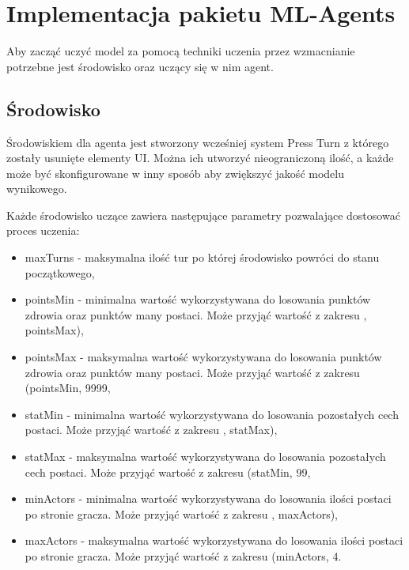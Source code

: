 \documentclass{SGGW-thesis}
\begin{document}
\section{Implementacja pakietu ML-Agents}
Aby zacząć uczyć model za pomocą techniki uczenia przez wzmacnianie potrzebne jest środowisko oraz uczący się w nim agent.
\subsection{Środowisko}
Środowiskiem dla agenta jest stworzony wcześniej system Press Turn z którego zostały usunięte elementy UI. Można ich utworzyć nieograniczoną ilość, a każde może być skonfigurowane w inny sposób aby zwiększyć jakość modelu wynikowego.

\pagebreak
Każde środowisko uczące zawiera następujące parametry pozwalające dostosować proces uczenia:
\begin{itemize}
  \item{maxTurns - maksymalna ilość tur po której środowisko powróci do stanu początkowego},
  \item{pointsMin - minimalna wartość wykorzystywana do losowania punktów zdrowia oraz punktów many postaci. Może przyjąć wartość z zakresu , pointsMax)},
  \item{pointsMax - maksymalna wartość wykorzystywana do losowania punktów zdrowia oraz punktów many postaci. Może przyjąć wartość z zakresu (pointsMin, 9999\textrangle},
  \item{statMin - minimalna wartość wykorzystywana do losowania pozostałych cech postaci. Może przyjąć wartość z zakresu , statMax)},
  \item{statMax - maksymalna wartość wykorzystywana do losowania pozostałych cech postaci. Może przyjąć wartość z zakresu (statMin, 99\textrangle},
  \item{minActors - minimalna wartość wykorzystywana do losowania ilości postaci po stronie gracza. Może przyjąć wartość z zakresu , maxActors)},
  \item{maxActors - maksymalna wartość wykorzystywana do losowania ilości postaci po stronie gracza. Może przyjąć wartość z zakresu (minActors, 4\textrangle}.
\end{itemize}
\end{document}
